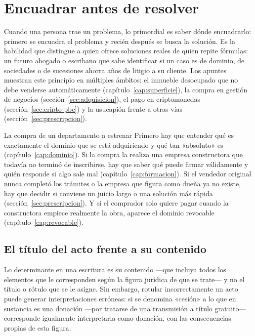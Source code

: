 \documentclass[12pt,oneside]{book}
\begin{document}
\section{Encuadrar antes de resolver}
\label{sec:encuadre}

Cuando una persona trae un problema, lo primordial es saber dónde encuadrarlo: primero se encuadra el problema y recién después se busca la solución. Es la habilidad que distingue a quien ofrece soluciones reales de quien repite fórmulas: un futuro abogado o escribano que sabe identificar si un caso es de dominio, de sociedades o de sucesiones ahorra años de litigio a su cliente. Los apuntes muestran este principio en múltiples ámbitos: el inmueble desocupado que no debe venderse automáticamente (capítulo~\ref{cap:superficie}), la compra en gestión de negocios (sección~\ref{sec:adquisicion}), el pago en criptomonedas (sección~\ref{sec:cripto-pbc}) y la usucapión frente a otras vías (sección~\ref{sec:prescripcion}).

\begin{example}{La compra de un departamento a estrenar}
Primero hay que entender qué es exactamente el dominio que se está adquiriendo y qué tan «absoluto» es (capítulo~\ref{cap:dominio}). Si la compra la realiza una empresa constructora que todavía no terminó de inscribirse, hay que saber qué puede firmar válidamente y quién responde si algo sale mal (capítulo~\ref{cap:formacion}). Si el vendedor original nunca completó los trámites o la empresa que figura como dueña ya no existe, hay que decidir si conviene un juicio largo o una solución más rápida (sección~\ref{sec:prescripcion}). Y si el comprador solo quiere pagar cuando la constructora empiece realmente la obra, aparece el dominio revocable (capítulo~\ref{cap:revocable}).
\end{example}

\subsection{El título del acto frente a su contenido}

\begin{important}
Lo determinante en una escritura es su contenido ---que incluya todos los elementos que le corresponden según la figura jurídica de que se trate--- y no el título o rótulo que se le asigne. Sin embargo, rotular incorrectamente un acto puede generar interpretaciones erróneas: si se denomina «cesión» a lo que en sustancia es una donación ---por tratarse de una transmisión a título gratuito--- corresponde igualmente interpretarla como donación, con las consecuencias propias de esta figura.
\end{important}
\end{document}

